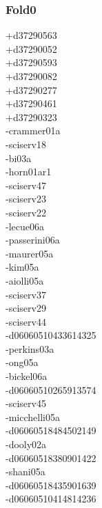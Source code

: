 \begin{multicols}{3}
\subsubsection*{Fold0}
+d37290563\\
+d37290052\\
+d37290593\\
+d37290082\\
+d37290277\\
+d37290461\\
+d37290323\\
-crammer01a\\
-sciserv18\\
-bi03a\\
-horn01ar1\\
-sciserv47\\
-sciserv23\\
-sciserv22\\
-lecue06a\\
-passerini06a\\
-maurer05a\\
-kim05a\\
-aiolli05a\\
-sciserv37\\
-sciserv29\\
-sciserv44\\
-d06060510433614325\\
-perkins03a\\
-ong05a\\
-bickel06a\\
-d06060510265913574\\
-sciserv45\\
-micchelli05a\\
-d06060518484502149\\
-dooly02a\\
-d06060518380901422\\
-shani05a\\
-d06060518435901639\\
-d06060510414814236\\

\end{multicols}
